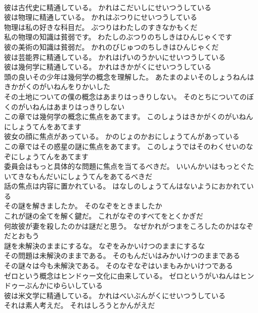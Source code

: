 \documentclass[8pt]{extreport}
\begin{document}
\begin{CJK}{UTF8}{min}
\\	彼は古代史に精通している。	かれはこだいしにせいつうしている 
\\	彼は物理に精通している。	かれはぶつりにせいつうしている 
\\	物理は私の好きな科目だ。	ぶつりはわたしのすきなかもくだ 
\\	私の物理の知識は貧弱です。	わたしのぶつりのちしきはひんじゃくです 
\\	彼の美術の知識は貧弱だ。	かれのびじゅつのちしきはひんじゃくだ 
\\	彼は芸能界に精通している。	かれはげいのうかいにせいつうしている 
\\	彼は幾何学に精通している。	かれはきかがくにせいつうしている 
\\	頭の良いその少年は幾何学の概念を理解した。	あたまのよいそのしょうねんはきかがくのがいねんをりかいした 
\\	その土地についての僕の概念はあまりはっきりしない。	そのとちについてのぼくのがいねんはあまりはっきりしない 
\\	この章では幾何学の概念に焦点をあてます。	このしょうはきかがくのがいねんにしょうてんをあてます 
\\	彼女の顔に焦点があっている。	かのじょのかおにしょうてんがあっている 
\\	この章ではその惑星の謎に焦点をあてます。	このしょうではそのわくせいのなぞにしょうてんをあてます 
\\	委員会はもっと具体的な問題に焦点を当てるべきだ。	いいんかいはもっとぐたいてきなもんだいにしょうてんをあてるべきだ 
\\	話の焦点は内容に置かれている。	はなしのしょうてんはないようにおかれている 
\\	その謎を解きましたか。	そのなぞをときましたか 
\\	これが謎の全てを解く鍵だ。	これがなぞのすべてをとくかぎだ 
\\	何故彼が妻を殺したのかは謎だと思う。	なぜかれがつまをころしたのかはなぞだとおもう 
\\	謎を未解決のままにするな。	なぞをみかいけつのままにするな 
\\	その問題は未解決のままである。	そのもんだいはみかいけつのままである 
\\	その謎々は今も未解決である。	そのなぞなぞはいまもみかいけつである 
\\	ゼロという概念はヒンドゥー文化に由来している。	ゼロというがいねんはヒンドゥーぶんかにゆらいしている 
\\	彼は米文学に精通している。	かれはべいぶんがくにせいつうしている 
\\	それは素人考えだ。	それはしろうとかんがえだ 

\end{CJK}
\end{document}
